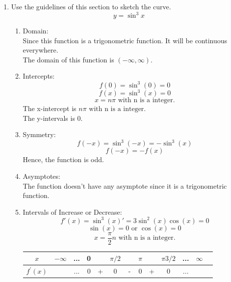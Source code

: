 \documentclass[12pt]{article}
\begin{document}
\begin{enumerate}
\begin{enumerate}
\begin{figure}[!h]
\begin{framed}
                \end{framed}
            \end{figure} 
        \end{enumerate}
        \setcounter{enumi}{32}
        \item Use the guidelines of this section to sketch the curve.
            \[y = \sin^3 x\]
        \begin{enumerate}
            \item Domain:\\
                Since this function is a trigonometric function. It will be continuous everywhere.\\
                The domain of this function is $(-\infty, \infty)$.
            \item Intercepts:
                \[f(0) = \sin^3 (0) = 0\]
                \[f(x) = \sin^3 (x) = 0\]
                \[x = n\pi \text{ with n is a integer.}\]
            The x-intercept is $n\pi \text{ with n is a integer.}$\\
            The y-intervals is 0.
            \newpage
            \item Symmetry:
                \[f(-x) = \sin^3(-x) = -\sin^3(x)\]
                \[f(-x) = -f(x)\]
            Hence, the function is odd.
            \item Asymptotes:\\
            The function doesn't have any asymptote since it is a trigonometric function.
            \item Intervals of Increase or Decrease:
                \[f'(x) = \sin^3(x)' = 3\sin^2(x)\cos(x) = 0\]
                \[\sin(x) = 0 \text{ or }\cos(x) = 0\]
                \[x = \frac{\pi}{2}n \text{ with n is a integer.}\]
                \begin{center}
                    \begin{tabular}{c c c c c c c c c c c c c}
                        $x$ & $-\infty$ & ... & 0 & ~ & $\pi/2$ & ~ & $\pi$ & ~ & $\pi 3/2$ & ... & $\infty$ \\ 
                        \hline 
                        $f^{\prime} (x)$ & ~ & ... & 0 & + & 0 & - & 0 & + & 0 & ... \\ 

\end{tabular}
\end{center}
\end{enumerate}
\end{enumerate}
\end{document}
